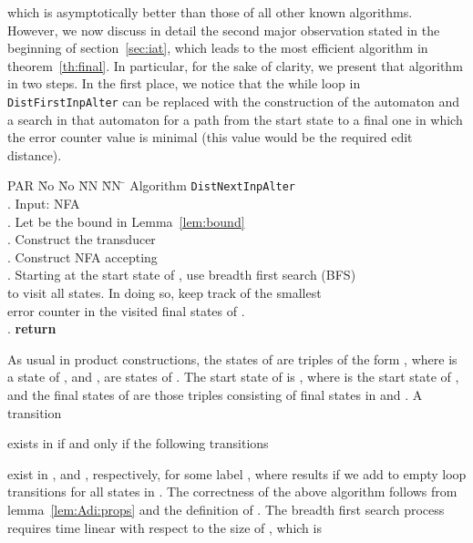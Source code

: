 \documentclass{article}
\theoremstyle{plain}
\theoremstyle{definition}
\theoremstyle{remark}
\begin{document}
which is asymptotically better than those of all other
known algorithms. However, we now discuss in detail the second major observation stated in the beginning of section~\ref{sec:iat}, which leads to the most efficient algorithm in theorem~\ref{th:final}. In particular, for the sake of clarity, we present that algorithm in two steps.
In the first place, we notice that the while loop
in \texttt{DistFirstInpAlter}
can be replaced with the construction
of the automaton  and a search
in that automaton for a path from the start state to
a final one in which the error counter value is minimal (this
value would be the required edit distance).
\begin{tabbing}
PAR \= No \= No \= NN \= NN \=\kill
\> Algorithm \texttt{DistNextInpAlter} \\
.\> Input: NFA  \hspace{4mm} \\
.\> Let  be the bound in Lemma~\ref{lem:bound}\\
.\> Construct the transducer  \\
.\> Construct NFA   accepting
        \\
.\> Starting at the start state of , use breadth first search (BFS) \\
\>   \> to visit all states. In doing so, keep track of the smallest\\
\>   \> error counter  in the visited final states of .\\
. \> \textbf{return} 
\end{tabbing}
As usual in product constructions, the states of  are triples of the form
, where  is a state of , and ,  are states of . The start state of  is
, where  is the start state of , and the final states of  are those triples consisting of final states in  and . A transition

exists in  if and only if the following transitions

exist in ,  and , respectively,
for some label , where  results if we add to
 empty  loop transitions  for all states
 in . The correctness of the above algorithm follows
from lemma~\ref{lem:Adi:props} and the definition of
. The breadth first search process requires time
linear with respect to the size of , which is
\end{document}
